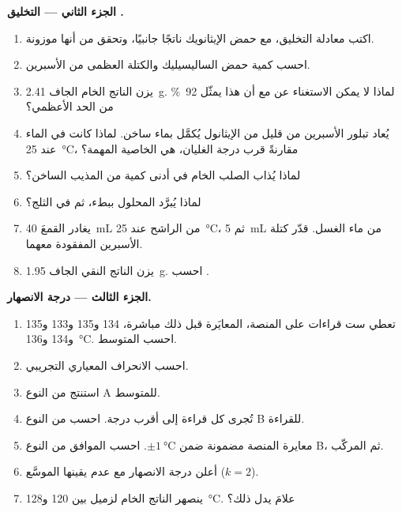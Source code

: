 \begin{problem}
\noindent\textbf{الجزء الثاني --- التخليق .}
\begin{enumerate}[resume]
  \item اكتب معادلة التخليق، مع حمض الإيثانويك
         ناتجًا جانبيًا، وتحقق من أنها موزونة.
  \item احسب كمية حمض الساليسيليك والكتلة العظمى من
        الأسبرين.
  \item يزن الناتج الخام الجاف \qty{2.41}{g}. لماذا لا يمكن
        الاستغناء عن  مع أن هذا يمثّل
        \qty{92}{\percent} من الحد الأعظمي؟
  \item يُعاد تبلور الأسبرين من قليل من الإيثانول يُكمَّل بماء
        ساخن. لماذا كانت  في الماء عند \qty{25}{\celsius}، مقارنةً
         قرب درجة الغليان، هي الخاصية المهمة؟
  \item لماذا يُذاب الصلب الخام في أدنى كمية من المذيب الساخن؟
  \item لماذا يُبرَّد المحلول ببطء، ثم في الثلج؟
  \item يغادر القمعَ \qty{40}{mL} من الراشح عند \qty{25}{\celsius}،
        ثم \qty{5}{mL} من ماء الغسل. قدّر كتلة الأسبرين
        المفقودة معهما.
  \item يزن الناتج النقي الجاف \qty{1.95}{g}. احسب .
\end{enumerate}

\noindent\textbf{الجزء الثالث --- درجة الانصهار.}
\begin{enumerate}[resume]
  \item تعطي ست قراءات على المنصة، المعايَرة قبل ذلك مباشرة، 134 و135
        و133 و135 و134 و\qty{136}{\celsius}. احسب المتوسط.
  \item احسب الانحراف المعياري التجريبي.
  \item استنتج  من النوع A للمتوسط.
  \item تُجرى كل قراءة إلى أقرب درجة. احسب  من النوع B
        للقراءة.
  \item معايرة المنصة مضمونة ضمن
        $\pm\qty{1}{\celsius}$. احسب  الموافق من النوع B،
        ثم  المركّب.
  \item أعلن درجة الانصهار مع عدم يقينها الموسَّع ($k = 2$).
  \item ينصهر الناتج الخام لزميل بين 120
        و\qty{128}{\celsius}. علامَ يدل ذلك؟
\end{enumerate}


\end{problem}
